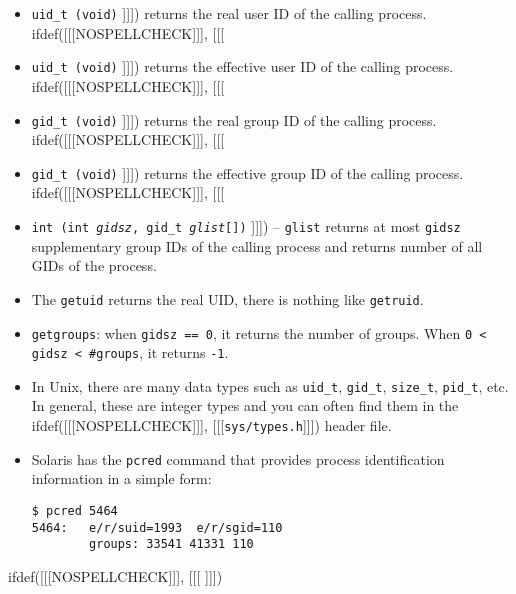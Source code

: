 \begin{slide}
\begin{itemize}
ifdef([[[NOSPELLCHECK]]], [[[
\item \texttt{uid\_t (void)}
]]])
returns the real user ID of the calling process.
ifdef([[[NOSPELLCHECK]]], [[[
\item \texttt{uid\_t (void)}
]]])
returns the effective user ID of the calling process.
ifdef([[[NOSPELLCHECK]]], [[[
\item \texttt{gid\_t (void)}
]]])
returns the real group ID of the calling process.
ifdef([[[NOSPELLCHECK]]], [[[
\item \texttt{gid\_t (void)}
]]])
returns the effective group ID of the calling process.
ifdef([[[NOSPELLCHECK]]], [[[
\item \texttt{int (int \emph{gidsz}, gid\_t \emph{glist}[])}
]]])
-- \texttt{glist} returns at most \texttt{gidsz} supplementary group
IDs of the calling process and returns number of all GIDs of the process.
\end{itemize}
\end{slide}

\begin{itemize}
\item The \texttt{getuid} returns the real UID, there is nothing like
\texttt{getruid}.
\item \texttt{getgroups}: when \texttt{gidsz~==~0}, it returns the number of
groups. When \texttt{0 < gidsz < \#groups}, it returns \texttt{-1}.
\item In Unix, there are many data types such as \verb#uid_t#, \verb#gid_t#,
\verb#size_t#, \verb#pid_t#, etc.  In general, these are integer types and you
can often find them in the
ifdef([[[NOSPELLCHECK]]], [[[\texttt{sys/types.h}]]]) header
file.
\item Solaris has the \texttt{pcred} command that provides process
identification information in a simple form:

\begin{verbatim}
$ pcred 5464
5464:   e/r/suid=1993  e/r/sgid=110
        groups: 33541 41331 110
\end{verbatim}
\end{itemize}


ifdef([[[NOSPELLCHECK]]], [[[
]]])

